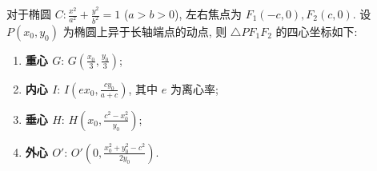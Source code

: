 \begin{statementbox}
对于椭圆 $C: \frac{x^2}{a^2} + \frac{y^2}{b^2} = 1$ ($a>b>0$), 左右焦点为 $F_1(-c, 0), F_2(c, 0)$. 设 $P(x_0, y_0)$ 为椭圆上异于长轴端点的动点, 则 $\triangle PF_1F_2$ 的四心坐标如下:
\begin{enumerate}
    \item \textbf{重心 $G$}: $G\left( \frac{x_0}{3}, \frac{y_0}{3} \right)$;
    \item \textbf{内心 $I$}: $I\left( ex_0, \frac{cy_0}{a+c} \right)$, 其中 $e$ 为离心率;
    \item \textbf{垂心 $H$}: $H\left( x_0, \frac{c^2-x_0^2}{y_0} \right)$;
    \item \textbf{外心 $O'$}: $O'\left( 0, \frac{x_0^2+y_0^2-c^2}{2y_0} \right)$.
\end{enumerate}
\end{statementbox}